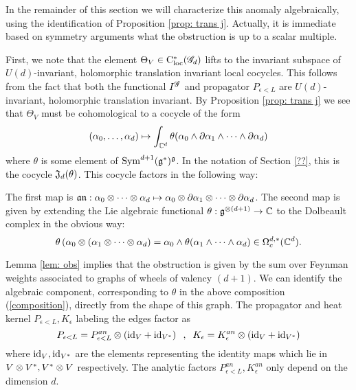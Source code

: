 In the remainder of this section we will characterize this anomaly algebraically, using the identification of Proposition \ref{prop: trans j}. 
Actually, it is immediate based on symmetry arguments what the obstruction is up to a scalar multiple. 

First, we note that the element $\Theta_V \in {\rm C}_{\rm loc}^*(\mathscr G_d)$ lifts to the invariant subspace of $U(d)$-invariant, holomorphic translation invariant local cocycles.
This follows from the fact that both the functional $I^{\mathscr G}$ and propagator $P_{\epsilon<L}$ are $U(d)$-invariant, holomorphic translation invariant.
By Proposition \ref{prop: trans j} we see that $\Theta_V$ must be cohomological to a cocycle of the form
\[
(\alpha_0, \ldots, \alpha_d) \mapsto \int_{\mathbb C^d} \theta(\alpha_0 \wedge \partial \alpha_1 \wedge \cdots \wedge \partial \alpha_d) 
\]
where $\theta$ is some element of ${\rm Sym}^{d+1}(\mathfrak g^*)^\mathfrak g$.
In the notation of Section \ref{??}, this is the cocycle $\mathfrak J_d (\theta)$. 
This cocycle factors in the following way:
\beqn\label{composition}
\eeqn
The first map is $\mathfrak a \mathfrak n : \alpha_0 \otimes \cdots \otimes \alpha_d \mapsto \alpha_0 \otimes \partial \alpha_1 \otimes \cdots \otimes \partial \alpha_d$.
The second map is given by extending the Lie algebraic functional $\theta : \mathfrak g^{\otimes (d+1)} \to \mathbb C$ to the Dolbeault complex in the obvious way:
\[
\theta \left(\alpha_0 \otimes (\alpha_1 \otimes \cdots \otimes \alpha_d\right) = \alpha_0 \wedge \theta(\alpha_1 \wedge \cdots \wedge \alpha_d) \in \Omega^{d,*}_c(\mathbb C^d).
\]

Lemma \ref{lem: obs} implies that the obstruction is given by the sum over Feynman weights associated to graphs of wheels of valency $(d+1)$.
We can identify the algebraic component, corresponding to $\theta$ in the above composition (\ref{composition}), directly from the shape of this graph. 
The propagator and heat kernel $P_{\epsilon<L}, K_\epsilon$ labeling the edges factor as
\[
P_{\epsilon<L} = P^{an}_{\epsilon<L} \otimes \left({\rm id}_{V} + {\rm id}_{V^*}\right) \;\; , \;\; K_{\epsilon} = K_{\epsilon}^{an} \otimes \left({\rm id}_{V} + {\rm id}_{V^*}\right)
\]
where ${\rm id}_V, {\rm id}_{V^*}$ are the elements representing the identity maps which lie in $V \otimes V^*, V^* \otimes V$ respectively. 
The analytic factors $P^{an}_{\epsilon<L},  K_{\epsilon}^{an}$ only depend on the dimension $d$. 


